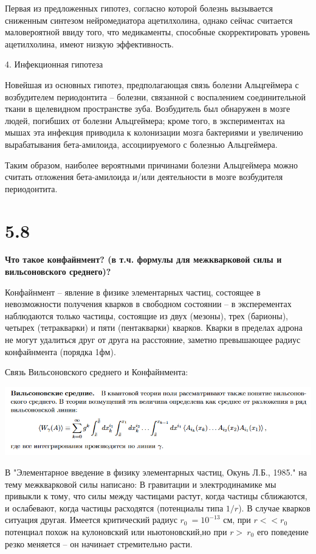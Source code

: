 \documentclass[a4paper,14pt]{article}
\begin{document}
Первая из предложенных гипотез, согласно которой болезнь вызывается сниженным синтезом нейромедиатора ацетилхолина, однако сейчас считается маловероятной ввиду того, что медикаменты, способные скорректировать уровень ацетилхолина, имеют низкую эффективность.

4. Инфекционная гипотеза

Новейшая из основных гипотез, предполагающая связь болезни Альцгеймера с возбудителем периодонтита – болезни, связанной с воспалением соединительной ткани в щелевидном пространстве зуба. Возбудитель был обнаружен в мозге людей, погибших от болезни Альцгеймера; кроме того, в экспериментах на мышах эта инфекция приводила к колонизации мозга бактериями и увеличению вырабатывания бета-амилоида, ассоциируемого с болезнью Альцгеймера.

Таким образом, наиболее вероятными причинами болезни Альцгеймера можно считать отложения бета-амилоида и/или деятельности в мозге возбудителя периодонтита.

\section*{5.8}

\begin{center}
	\LARGE{\textbf{Что такое конфайнмент? (в т.ч. формулы для межкварковой силы и вильсоновского среднего)?}}\\
\end{center}

Конфайнмент – явление в физике элементарных частиц, состоящее в невозможности получения кварков в свободном состоянии – в эксперементах наблюдаются только частицы, состоящие из двух (мезоны), трех (барионы), четырех (тетракварки) и пяти (пентакварки) кварков. Кварки в пределах адрона не могут удалиться друг от друга на расстояние, заметно превышающее радиус конфайнмента (порядка 1фм).

Связь Вильсоновского среднего и Конфайнмента:
\begin{center}
\includegraphics[width=1.00\textwidth]{5_8_0}
\end{center}

В "Элементарное введение в физику элементарных частиц, Окунь Л.Б., 1985." на тему межкварковой силы написано:
В гравитации и электродинамике мы привыкли к тому, что силы между частицами растут, когда частицы сближаются, и ослабевают, когда частицы расходятся (потенциалы типа $1/r$). В случае кварков ситуация другая. Имеется критический радиус $r_0~=10^{-13}$ см, при $r<<r_{0}$ потенциал похож на кулоновский или ньютоновский,но при $r>~r_0$ его поведение резко меняется – он начинает стремительно расти.
\end{document}

